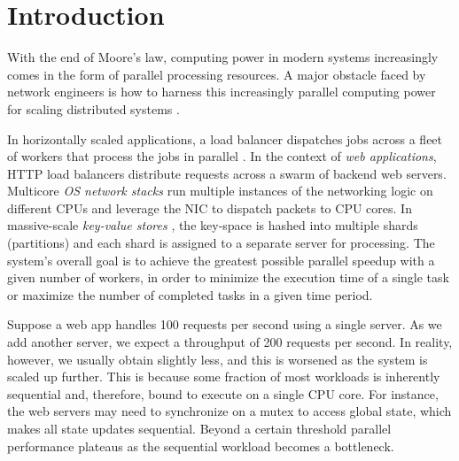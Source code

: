 \section{Introduction}\label{sec:introduction}

With the end of Moore's law, computing power in modern systems increasingly comes in the form of parallel processing resources.  A major obstacle faced by network engineers is how to harness this increasingly parallel computing power for scaling distributed systems \cite{265065, 10.5555/3307441.3307467, 10.1145/2815400.2815423, 10.1145/3098822.3098826, 10.5555/3154630.3154639}.

In horizontally scaled applications, a load balancer dispatches jobs across a fleet of workers that process the jobs in parallel \cite{10.5555/3235491}.  In the context of \emph{web applications}, HTTP load balancers \cite{194966, 211279, 9552525} distribute requests across a swarm of backend web servers.  %
Multicore \emph{OS network stacks} \cite{211263, 10.1145/3359989.3365412, 10.1145/3452296.3472914} run multiple instances of the networking logic on different CPUs and leverage the NIC to dispatch packets to CPU cores. %
In massive-scale \emph{key-value stores} \cite{ghigoff2021bmc}, the key-space is hashed into multiple shards (partitions) and each shard is assigned to a separate server for processing.  The system's overall goal is to achieve the greatest possible parallel speedup with a given number of workers, in order to minimize the execution time of a single task or maximize the number of completed tasks in a given time period.

Suppose a web app handles 100 requests per second using a single server. As we add another server, we expect a throughput of 200 requests per second. In reality, however, we usually obtain slightly less, and this is worsened as the system is scaled up further. This is because some fraction of most workloads is inherently sequential and, therefore, bound to execute on a single CPU core. For instance, the web servers may need to synchronize on a mutex to access global state, which makes all state updates sequential.  Beyond a certain threshold parallel performance plateaus as the sequential workload becomes a bottleneck.

